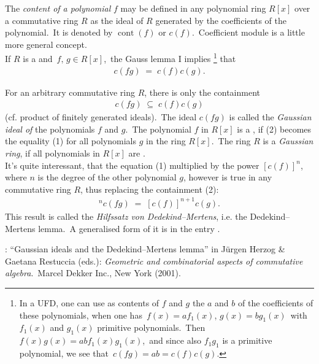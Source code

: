 \documentclass[12pt]{article}
\theoremstyle{definition}
\begin{document}
The \emph{content of a polynomial} $f$ may be defined in any polynomial ring $R[x]$ over a commutative ring $R$ as the ideal of $R$ generated by the coefficients of the polynomial.\, It is denoted by $\operatorname{cont}(f)$ or $c(f)$.\, Coefficient module is a little more general concept.\\

If $R$ is a  and\, $f,\,g \in R[x]$,\, the Gauss lemma I 
implies \footnote{In a UFD, one can use as contents of $f$ and $g$ the  $a$ and $b$ of the coefficients of these polynomials, when one has\, $f(x) = af_1(x)$,\; $g(x) = bg_1(x)$\, with $f_1(x)$ and $g_1(x)$ primitive polynomials.\, Then\, $f(x)g(x) = abf_1(x)g_1(x)$,\, and since also $f_1g_1$ is a primitive polynomial, we see that\, $c(fg) = ab = c(f)c(g)$.} that
\begin{align}
c(fg) \;=\; c(f)c(g).
\end{align}

For an arbitrary commutative ring $R$, there is only the containment
\begin{align}
c(fg) \;\subseteq\; c(f)c(g)
\end{align}
(cf. product of finitely generated ideals).\, The ideal $c(fg)$ is called the \emph{Gaussian ideal of} the polynomials
$f$ and $g$.\, The polynomial $f$ in $R[x]$ is a , if (2) becomes the equality (1) for all polynomials $g$ in the ring $R[x]$.\, The ring $R$ is a \emph{Gaussian ring}, if all polynomials in 
$R[x]$ are .\\

It's quite interessant, that the equation (1) multiplied by the power $[c(f)]^n$, where $n$ is the degree of the other polynomial $g$, however is true in any commutative ring $R$, thus replacing the containment (2):
\begin{align}
[c(f)]^nc(fg) \;=\; [c(f)]^{n+1}c(g).
\end{align}
This result is called the 
\emph{Hilfssatz von Dedekind--Mertens}, i.e. the 
Dedekind--Mertens lemma.\, A generalised form of it is in the 
entry 
.

\begin{thebibliography}{8}
: ``Gaussian ideals and the Dedekind--Mertens lemma'' in J\"urgen Herzog \& Gaetana Restuccia (eds.): {\em Geometric and combinatorial aspects of commutative algebra}.\, Marcel Dekker Inc., New York (2001).
\end{thebibliography}

\end{document}
